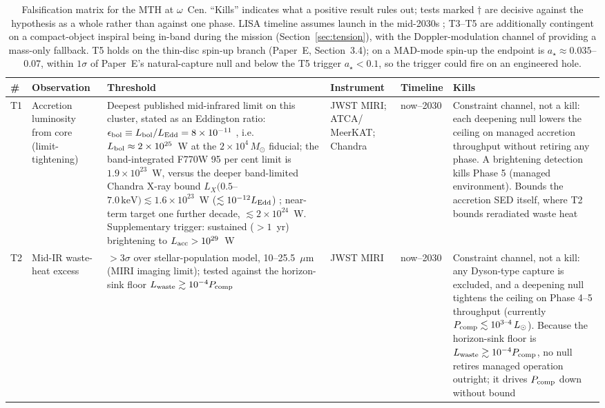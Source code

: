 \documentclass[11pt]{article}
\newcommand{\msun}{\ensuremath{M_\odot}}
\newcommand{\astar}{\ensuremath{a_\star}}
\begin{document}
\begin{table}[tbp]
\centering
\caption{Falsification matrix for the MTH at $\omega$~Cen. ``Kills'' indicates what a positive result rules out; tests marked $\dagger$ are decisive against the hypothesis as a whole rather than against one phase. LISA timeline assumes launch in the mid-2030s \citep{Colpi2024}; T3--T5 are additionally contingent on a compact-object inspiral being in-band during the mission (Section~\ref{sec:tension}), with the Doppler-modulation channel of \citet{Strokov2022} providing a mass-only fallback. T5 holds on the thin-disc spin-up branch (Paper~E, Section~3.4); on a MAD-mode spin-up the endpoint is $\astar \approx 0.035$--$0.07$, within $1\sigma$ of Paper~E's natural-capture null and below the T5 trigger $\astar < 0.1$, so the trigger could fire on an engineered hole.}
\label{tab:tests}
\scriptsize
\begin{tabular}{p{0.6cm}p{3.1cm}p{3.1cm}p{2.5cm}p{1.6cm}p{2.5cm}}
\toprule
\# & Observation & Threshold & Instrument & Timeline & Kills \\
\midrule
T1 & Accretion luminosity from core (limit-tightening) & Deepest published mid-infrared limit on this cluster, stated as an Eddington ratio: $\epsilon_{\rm bol} \equiv L_{\rm bol}/L_{\rm Edd} = 8\times10^{-11}$ \citep{Chen2025JWST}, i.e.\ $L_{\rm bol} \approx 2\times10^{25}$~W at the $2\times10^{4}\,\msun$ fiducial; the band-integrated F770W 95 per cent limit is $1.9\times10^{23}$~W, versus the deeper band-limited Chandra X-ray bound $L_X(0.5$--$7.0\,\mathrm{keV}) \lesssim 1.6\times10^{23}$~W ($\lesssim 10^{-12}L_{\rm Edd}$) \citep{Haggard2013}; near-term target one further decade, $\lesssim 2\times10^{24}$~W. Supplementary trigger: sustained ($>1$~yr) brightening to $L_{\rm acc} > 10^{29}$~W & JWST MIRI; ATCA/ MeerKAT; Chandra & now--2030 & Constraint channel, not a kill: each deepening null lowers the ceiling on managed accretion throughput without retiring any phase. A brightening detection kills Phase 5 (managed environment). Bounds the accretion SED itself, where T2 bounds reradiated waste heat \citep{Haggard2013,Mahida2026} \\
T2 & Mid-IR waste-heat excess & $>3\sigma$ over stellar-population model, 10--25.5~$\mu$m (MIRI imaging limit); tested against the horizon-sink floor $L_{\rm waste} \gtrsim 10^{-4} P_{\rm comp}$ \citep{Swanson2026Engineered} & JWST MIRI & now--2030 & Constraint channel, not a kill: any Dyson-type capture is excluded, and a deepening null tightens the ceiling on Phase 4--5 throughput (currently $P_{\rm comp} \lesssim 10^{3\text{--}4}\,L_\odot$). Because the horizon-sink floor is $L_{\rm waste} \gtrsim 10^{-4}P_{\rm comp}$, no null retires managed operation outright; it drives $P_{\rm comp}$ down without bound \\

\end{tabular}
\end{table}
\end{document}
